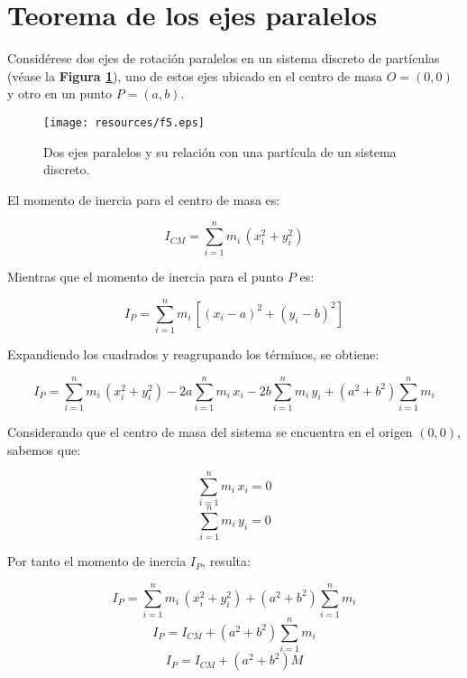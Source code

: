 \documentclass[letter,twoside,11pt]{article}
\begin{document}
\section{Teorema de los ejes paralelos \cite{Sears}}

Considérese dos ejes de rotación paralelos en un sistema discreto de partículas
(véase la \textbf{Figura \ref{figura5}}), uno de estos ejes ubicado en el centro
de masa $O = (0,0)$ y otro en un punto $P = (a,b)$.

\begin{figure}
\centering
\texttt{[image: resources/f5.eps]}
\caption{Dos ejes paralelos y su relación con una partícula de un sistema discreto.}
\label{figura5}
\end{figure}

El momento de inercia para el centro de masa es:

\begin{equation*}
    I_{CM} = \sum_{i=1}^{n} m_i\, (x^2_i + y^2_i)
\end{equation*}

Mientras que el momento de inercia  para el punto $P$ es:

\begin{equation*}
    I_{P} = \sum_{i=1}^{n} m_i\, [ (x_i-a)^2 + (y_i-b)^2 ]
\end{equation*}

Expandiendo los cuadrados y reagrupando los términos, se obtiene:

\begin{equation*}
    I_{P} = \sum_{i=1}^{n} m_i\, (x^2_i + y^2_i) - 2a \sum_{i=1}^{n} m_i\, x_i - 2b \sum_{i=1}^{n} m_i\, y_i + (a^2 + b^2) \sum_{i=1}^{n} m_i
\end{equation*}

Considerando que el centro de masa del sistema se encuentra en el origen
$(0,0)$, sabemos que:

\begin{equation*}
    \sum_{i=1}^{n} m_i\, x_i = 0
\end{equation*}
\begin{equation*}
    \sum_{i=1}^{n} m_i\, y_i = 0
\end{equation*}

Por tanto el momento de inercia $I_P$, resulta:

\begin{equation*}
    I_{P} = \sum_{i=1}^{n} m_i\, (x^2_i + y^2_i) + (a^2 + b^2) \sum_{i=1}^{n} m_i
\end{equation*}
\begin{equation*}
    I_{P} = I_{CM} + (a^2 + b^2) \sum_{i=1}^{n} m_i
\end{equation*}
\begin{equation*}
    I_{P} = I_{CM} + (a^2 + b^2) M
\end{equation*}
\end{document}
